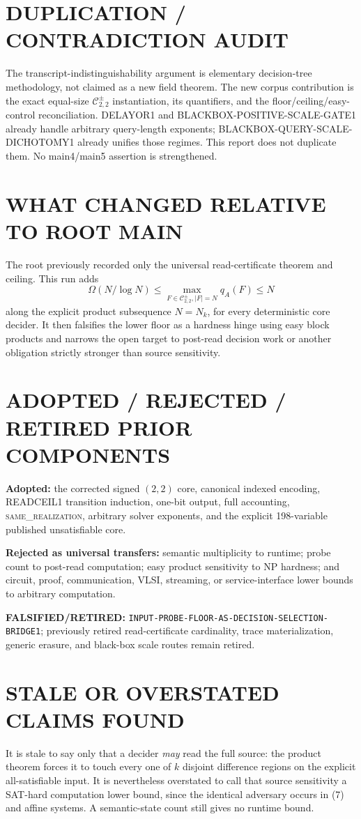 \documentclass[11pt]{article}
\newcommand{\Core}{\mathcal C_{2,2}^{\pm}}
\newcommand{\same}{\textsc{same\_realization}}
\begin{document}
\section{DUPLICATION / CONTRADICTION AUDIT}
The transcript-indistinguishability argument is elementary decision-tree
methodology, not claimed as a new field theorem.  The new corpus contribution
is the exact equal-size \(\Core\) instantiation, its quantifiers, and the
floor/ceiling/easy-control reconciliation.  DELAYOR1 and
BLACKBOX-POSITIVE-SCALE-GATE1 already handle arbitrary query-length exponents;
BLACKBOX-QUERY-SCALE-DICHOTOMY1 already unifies those regimes.  This report
does not duplicate them.  No main4/main5 assertion is strengthened.

\section{WHAT CHANGED RELATIVE TO ROOT MAIN}
The root previously recorded only the universal read-certificate theorem and
ceiling.  This run adds
\[
 \Omega(N/\log N)\le \max_{F\in\Core,|F|=N}q_A(F)\le N
\]
along the explicit product subsequence \(N=N_k\), for every deterministic
core decider.  It then falsifies the lower floor as a hardness hinge using
easy block products and narrows the open target to post-read decision work or
another obligation strictly stronger than source sensitivity.

\section{ADOPTED / REJECTED / RETIRED PRIOR COMPONENTS}
\textbf{Adopted:} the corrected signed \((2,2)\) core, canonical indexed
encoding, READCEIL1 transition induction, one-bit output, full accounting,
\same{}, arbitrary solver exponents, and the explicit 198-variable published
unsatisfiable core.

\textbf{Rejected as universal transfers:} semantic multiplicity to runtime;
probe count to post-read computation; easy product sensitivity to NP hardness;
and circuit, proof, communication, VLSI, streaming, or service-interface
lower bounds to arbitrary computation.

\textbf{FALSIFIED/RETIRED:}
\texttt{INPUT-PROBE-FLOOR-AS-DECISION-SELECTION-BRIDGE1}; previously retired
read-certificate cardinality, trace materialization, generic erasure, and
black-box scale routes remain retired.

\section{STALE OR OVERSTATED CLAIMS FOUND}
It is stale to say only that a decider \emph{may} read the full source: the
product theorem forces it to touch every one of \(k\) disjoint difference
regions on the explicit all-satisfiable input.  It is nevertheless overstated
to call that source sensitivity a SAT-hard computation lower bound, since the
identical adversary occurs in (7) and affine systems.  A semantic-state count
still gives no runtime bound.
\end{document}
